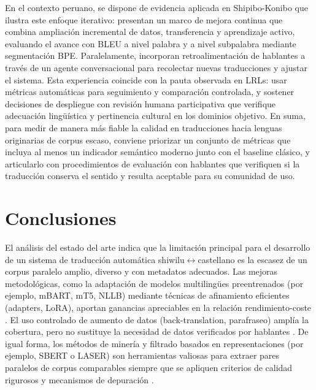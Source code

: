 \documentclass[12pt,a4paper,oneside]{book}
\begin{document}
En el contexto peruano, se dispone de evidencia aplicada en Shipibo-Konibo que ilustra este enfoque iterativo: \textcite{montoya2019} presentan un marco de mejora continua que combina ampliación incremental de datos, transferencia y aprendizaje activo, evaluando el avance con BLEU a nivel palabra y a nivel subpalabra mediante segmentación BPE. Paralelamente, incorporan retroalimentación de hablantes a través de un agente conversacional para recolectar nuevas traducciones y ajustar el sistema. Esta experiencia coincide con la pauta observada en LRLs: usar métricas automáticas para seguimiento y comparación controlada, y sostener decisiones de despliegue con revisión humana participativa que verifique adecuación lingüística y pertinencia cultural en los dominios objetivo. En suma, para medir de manera más fiable la calidad en traducciones hacia lenguas originarias de corpus escaso, conviene priorizar un conjunto de métricas que incluya al menos un indicador semántico moderno junto con el baseline clásico, y articularlo con procedimientos de evaluación con hablantes que verifiquen si la traducción conserva el sentido y resulta aceptable para su comunidad de uso.

\section{Conclusiones}\label{conclusiones}

El análisis del estado del arte indica que la limitación principal para el desarrollo de un sistema de traducción automática shiwilu$\leftrightarrow$castellano es la escasez de un corpus paralelo amplio, diverso y con metadatos adecuados. Las mejoras metodológicas, como la adaptación de modelos multilingües preentrenados (por ejemplo, mBART, mT5, NLLB) mediante técnicas de afinamiento eficientes (adapters, LoRA), aportan ganancias apreciables en la relación rendimiento-coste \parencite{liu2020mbart,hu2022lora}. El uso controlado de aumento de datos (back-translation, parafraseo) amplía la cobertura, pero no sustituye la necesidad de datos verificados por hablantes \parencite{sennrich2016bt,montoya2019}. De igual forma, los métodos de minería y filtrado basados en representaciones (por ejemplo, SBERT o LASER) son herramientas valiosas para extraer pares paralelos de corpus comparables siempre que se apliquen criterios de calidad rigurosos y mecanismos de depuración \parencite{reimers2019sbert,artetxe2019}.
\end{document}
